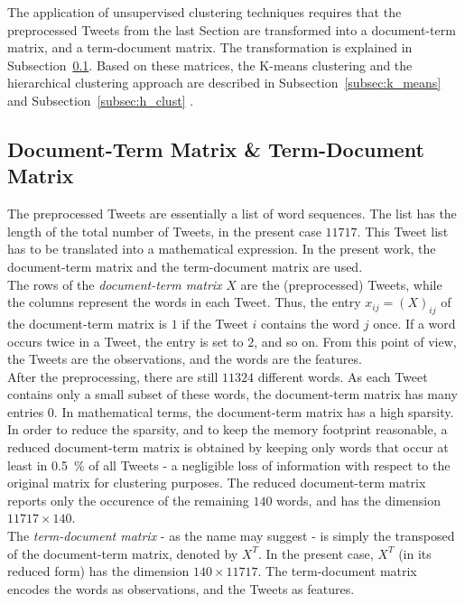 The application of unsupervised clustering techniques requires that the preprocessed Tweets from the last Section are transformed into a document-term matrix, and a term-document matrix. The transformation is explained in Subsection~\ref{subsec:matrix}. Based on these matrices, the K-means clustering and the hierarchical clustering approach are described in Subsection~\ref{subsec:k_means} and Subsection~\ref{subsec:h_clust} \cite{stat_2013}.

\subsection{Document-Term Matrix \& Term-Document Matrix}\label{subsec:matrix}
The preprocessed Tweets are essentially a list of word sequences. The list has the length of the total number of Tweets, in the present case $11717$. This Tweet list has to be translated into a mathematical expression. In the present work, the document-term matrix and the term-document matrix are used. \\

The rows of the \textit{document-term matrix} $X$ are the (preprocessed) Tweets, while the columns represent the words in each Tweet. Thus, the entry $x_{ij} = (X)_{ij}$ of the document-term matrix is $1$ if the Tweet $i$ contains the word $j$ once. If a word occurs twice in a Tweet, the entry is set to $2$, and so on. From this point of view, the Tweets are the observations, and the words are the features.\\

After the preprocessing, there are still $11324$ different words. As each Tweet contains only a small subset of these words, the document-term matrix has many entries $0$. In mathematical terms, the document-term matrix has a high sparsity. In order to reduce the sparsity, and to keep the memory footprint reasonable, a reduced document-term matrix is obtained by keeping only words that occur at least in \SI{0.5}{\percent} of all Tweets - a negligible loss of information with respect to the original matrix for clustering purposes. The reduced document-term matrix reports only the occurence of the remaining $140$ words, and has the dimension $11717 \times 140$.\\

The \textit{term-document matrix} - as the name may suggest - is simply the transposed of the document-term matrix, denoted by $X^T$. In the present case, $X^T$ (in its reduced form) has the dimension $140 \times 11717$. The term-document matrix encodes the words as observations, and the Tweets as features.	\\

